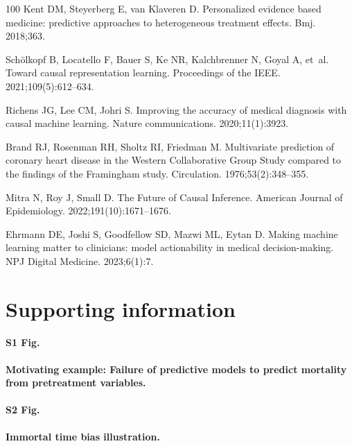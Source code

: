 \documentclass[10pt,letterpaper]{article}
\begin{document}
\begin{thebibliography}{100}
  Kent DM, Steyerberg E, van Klaveren D.
  \newblock Personalized evidence based medicine: predictive approaches to heterogeneous treatment effects.
  \newblock Bmj. 2018;363.

  Schölkopf B, Locatello F, Bauer S, Ke NR, Kalchbrenner N, Goyal A, et~al.
  \newblock Toward causal representation learning.
  \newblock Proceedings of the IEEE. 2021;109(5):612--634.

  Richens JG, Lee CM, Johri S.
  \newblock Improving the accuracy of medical diagnosis with causal machine learning.
  \newblock Nature communications. 2020;11(1):3923.

  Brand RJ, Rosenman RH, Sholtz RI, Friedman M.
  \newblock Multivariate prediction of coronary heart disease in the Western Collaborative Group Study compared to the findings of the Framingham study.
  \newblock Circulation. 1976;53(2):348--355.

  Mitra N, Roy J, Small D.
  \newblock The Future of Causal Inference.
  \newblock American Journal of Epidemiology. 2022;191(10):1671--1676.

  Ehrmann DE, Joshi S, Goodfellow SD, Mazwi ML, Eytan D.
  \newblock Making machine learning matter to clinicians: model actionability in medical decision-making.
  \newblock NPJ Digital Medicine. 2023;6(1):7.

\end{thebibliography}


\clearpage

\section*{Supporting information}

\paragraph*{S1 Fig.}
\label{apd:motivating_example}
{\bf Motivating example: Failure of predictive models to predict mortality
  from pretreatment variables.}

\paragraph*{S2 Fig.}
\label{apd:immortal_time_bias}
{\bf Immortal time bias illustration.}
\end{document}
